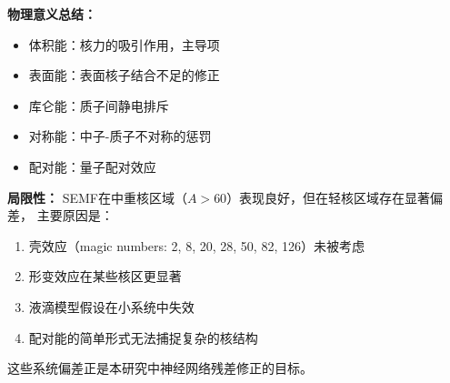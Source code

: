 \documentclass[12pt, a4paper]{article}
\begin{document}
\textbf{物理意义总结：}
\begin{itemize}
  \item 体积能：核力的吸引作用，主导项
  \item 表面能：表面核子结合不足的修正
  \item 库仑能：质子间静电排斥
  \item 对称能：中子-质子不对称的惩罚
  \item 配对能：量子配对效应
\end{itemize}

\textbf{局限性：}
SEMF在中重核区域（$A > 60$）表现良好，但在轻核区域存在显著偏差，
主要原因是：
\begin{enumerate}
  \item 壳效应（magic numbers: 2, 8, 20, 28, 50, 82, 126）未被考虑
  \item 形变效应在某些核区更显著
  \item 液滴模型假设在小系统中失效
  \item 配对能的简单形式无法捕捉复杂的核结构
\end{enumerate}

这些系统偏差正是本研究中神经网络残差修正的目标。
\end{document}
